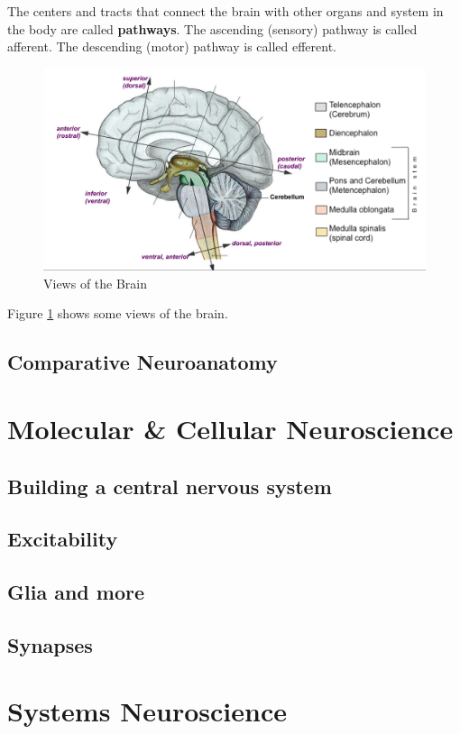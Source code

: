 \documentclass[11pt,article,oneside,a4paper]{memoir}
\begin{document}
The centers and tracts that connect the brain with other organs and system in
the body are called \textbf{pathways}. The ascending (sensory) pathway is called afferent.
The descending (motor) pathway is called efferent.

\begin{figure}
  \includegraphics[width=\linewidth]{imgs/viewsOfTheBrain.png}
  \caption{Views of the Brain}
  \label{fig:brain}
\end{figure}

Figure \ref{fig:brain} shows some views of the brain.

\subsection{Comparative Neuroanatomy}
\section{Molecular \& Cellular Neuroscience}
\subsection{Building a central nervous system}
\subsection{Excitability}
\subsection{Glia and more}
\subsection{Synapses}

\section{Systems Neuroscience}
\end{document}
